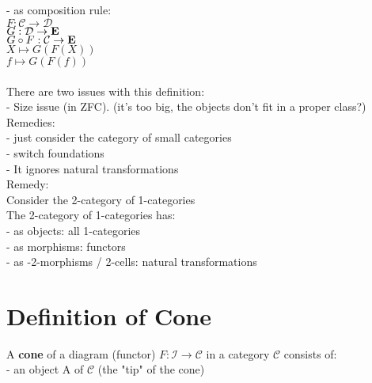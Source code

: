 \documentclass[a4paper, twoside, english, 11pt]{book}
\newcommand{\C}{\mathcal C}
\newcommand{\D}{\mathcal D}
\newcommand{\I}{\mathcal I}
\newcommand{\catname}[1]{{\normalfont\textbf{#1}}}
\begin{document}
- as composition rule: \\
\indent\indent
$F : \C \rightarrow \D$ \\
\indent\indent
$G : \D \rightarrow \catname E$ \\

\indent\indent
$G \circ F : \C \rightarrow \catname E$ \\
\indent\indent
$X \mapsto G(F(X))$ \\
\indent\indent
$f \mapsto G(F(f))$ \\\\

\noindent
There are two issues with this definition: \\

- Size issue (in ZFC). (it's too big, the objects don't fit in a proper class?) \\
\indent\indent
Remedies: \\

\indent\indent
- just consider the category of small categories \\

\indent\indent
- switch foundations \\

- It ignores natural transformations \\
\indent\indent
Remedy: \\
\indent\indent
Consider the 2-category of 1-categories \\

\indent\indent
The 2-category of 1-categories has: \\

\indent\indent\indent
- as objects: all 1-categories \\

\indent\indent\indent
- as morphisms: functors \\

\indent\indent\indent
- as -2-morphisms / 2-cells: natural transformations \\



\section{Definition of Cone}

A \textbf{cone} of a diagram (functor) $F : \I \rightarrow \C$ in a category $\C$ consists of: \\

- an object A of $\C$ (the "tip" of the cone) \\
\end{document}
